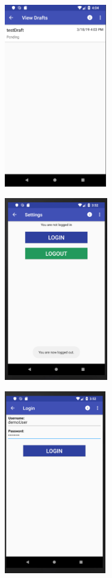\documentclass[onecolumn, draftclsnofoot,10pt, compsoc]{IEEEtran}
\begin{document}
\begin{center}
\includegraphics[height=8cm]{Beta_test_draft.png}
\end{center}

\begin{center}
\includegraphics[height=8cm]{Beta_settings_1.png}
\end{center}

\begin{center}
\includegraphics[height=8cm]{Beta_settings_2.png}
\end{center}
\end{document}
